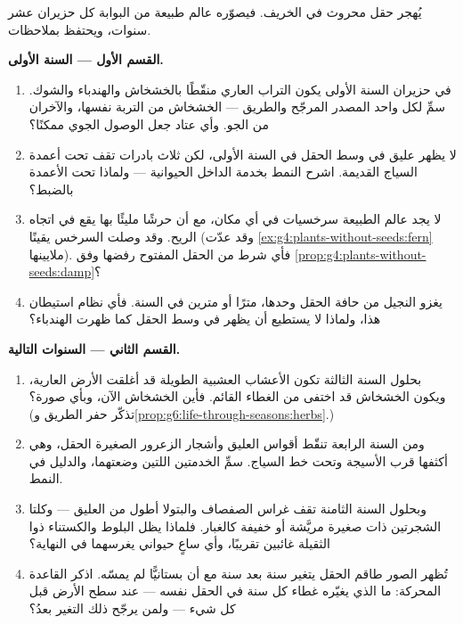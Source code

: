 \begin{problem}\label{pb:g6:how-plants-spread:1}
يُهجر حقل محروث في الخريف. فيصوّره عالم طبيعة من البوابة كل حزيران
عشر سنوات، ويحتفظ بملاحظات.

\medskip\noindent\textbf{القسم الأول --- السنة الأولى.}
\begin{enumerate}
  \item في حزيران السنة الأولى يكون التراب العاري منقّطًا بالخشخاش
        والهندباء والشوك. سمِّ لكل واحد المصدر المرجّح والطريق ---
        الخشخاش من التربة نفسها، والآخران من الجو. وأي عتاد جعل
        الوصول الجوي ممكنًا؟
  \item لا يظهر عليق في وسط الحقل في السنة الأولى، لكن ثلاث
        بادرات تقف تحت أعمدة السياج القديمة. اشرح النمط بخدمة
        الداخل الحيوانية --- ولماذا تحت الأعمدة بالضبط؟
  \item لا يجد عالم الطبيعة سرخسيات في أي مكان، مع أن حرشًا مليئًا
        بها يقع في اتجاه الريح. وقد وصلت  السرخس يقينًا
        (وقد عدّت \cref{ex:g4:plants-without-seeds:fern} ملايينها).
        فأي شرط من  الحقل المفتوح رفضها وفق
        \cref{prop:g4:plants-without-seeds:damp}؟
  \item يغزو النجيل من حافة الحقل وحدها، مترًا أو مترين في السنة.
        فأي نظام استيطان هذا، ولماذا لا يستطيع أن يظهر في وسط
        الحقل كما ظهرت الهندباء؟
\end{enumerate}

\medskip\noindent\textbf{القسم الثاني --- السنوات التالية.}
\begin{enumerate}[resume]
  \item بحلول السنة الثالثة تكون الأعشاب  العشبية
        الطويلة قد أغلقت الأرض العارية، ويكون الخشخاش قد اختفى من
        الغطاء القائم. فأين الخشخاش الآن، وبأي صورة؟ (تذكّر حفر
        الطريق و\cref{prop:g6:life-through-seasons:herbs}.)
  \item ومن السنة الرابعة تنقّط أقواس العليق وأشجار الزعرور
        الصغيرة الحقل، وهي أكثفها قرب الأسيجة وتحت خط السياج.
        سمِّ الخدمتين اللتين وضعتهما، والدليل في النمط.
  \item وبحلول السنة الثامنة تقف غراس الصفصاف والبتولا أطول من
        العليق --- وكلتا الشجرتين ذات  صغيرة مريَّشة أو خفيفة
        كالغبار. فلماذا يظل البلوط والكستناء ذوا  الثقيلة
        غائبين تقريبًا، وأي ساعٍ حيواني يغرسهما في النهاية؟
  \item تُظهر الصور طاقم الحقل يتغير سنة بعد سنة مع أن بستانيًّا لم
        يمسّه. اذكر القاعدة المحركة: ما الذي يغيّره غطاء كل سنة في
         الحقل نفسه ---  عند سطح الأرض قبل كل شيء ---
        ولمن يرجّح ذلك التغير بعدُ؟
\end{enumerate}


\end{problem}
